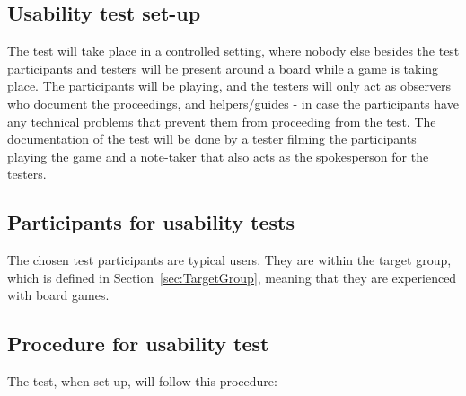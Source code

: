 \subsection{Usability test set-up}
The test will take place in a controlled setting, where nobody else besides the test participants and testers will be present around a board while a game is taking place. The participants will be playing, and the testers will only act as observers who document the proceedings, and helpers/guides - in case the participants have any technical problems that prevent them from proceeding from the test.
The documentation of the test will be done by a tester filming the participants playing the game and a note-taker that also acts as the spokesperson for the testers.

\subsection{Participants for usability tests}
The chosen test participants are typical users. They are within the target group, which is defined in Section~\ref{sec:TargetGroup}, meaning that they are experienced with board games. 

\subsection{Procedure for usability test}
The test, when set up, will follow this procedure: 

